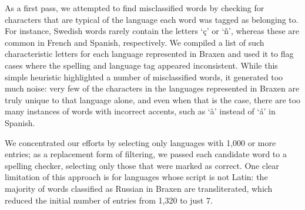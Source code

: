 \documentclass[10pt, a4paper]{article}
\begin{document}



As a first pass, we attempted to find misclassified words by checking for characters that are typical of the language each word was tagged as belonging to. For instance, Swedish words rarely contain the letters `ç' or `ñ', whereas these are common in French and Spanish, respectively. We compiled a list of such characteristic letters for each language represented in Braxen and used it to flag cases where the spelling and language tag appeared inconsistent. While this simple heuristic highlighted a number of misclassified words, it generated too much noise: very few of the characters in the languages represented in Braxen are truly unique to that language alone, and even when that is the case, there are too many instances of words with incorrect accents, such as `\`a' instead of `\'a' in Spanish.

We concentrated our efforts by selecting only languages with 1,000 or more entries; as a replacement form of filtering, we passed each candidate word to a spelling checker, selecting only those that were marked as correct. One clear limitation of this approach is for languages whose script is not Latin: the majority of words classified as Russian in Braxen are transliterated, which reduced the initial number of entries from 1,320 to just 7.
\end{document}
